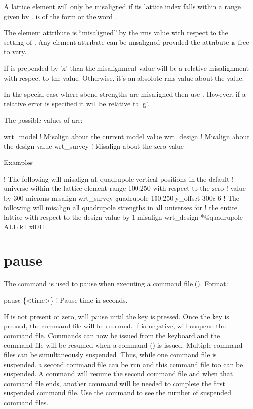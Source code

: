 A lattice element will only be misaligned if its lattice index falls within a range given
by .  is of the form  or the word .

The element attribute  is ``misaligned'' by the rms value
 with respect to the setting of . Any element attribute can
be misaligned provided the attribute is free to vary.

If  is prepended by 'x' then the misalignment value will be a
relative misalignment with respect to the  value. Otherwise, it's an absolute
rms value about the  value.

In the special case where sbend strengths are misaligned then use . However, if a relative error is specified it will be relative to 'g'.

The possible values of  are:
\begin{example}
  wrt_model          ! Misalign about the current model value
  wrt_design         ! Misalign about the design value
  wrt_survey         ! Misalign about the zero value
\end{example}

Examples
\begin{example}
   ! The following will misalign all quadrupole vertical positions in the default
   ! universe within the lattice element range 100:250 with respect to the zero 
   ! value by 300 microns
  misalign wrt_survey quadrupole 100:250 y_offset 300e-6
   ! The following will misalign all quadrupole strengths in all universes for
   ! the entire lattice with respect to the design value by 1%
  misalign wrt_design *@quadrupole ALL k1 x0.01
\end{example}

\section{pause}
\label{s:pause}

The  command is used to pause \tao when executing a command file
(). Format:
\begin{example}
  pause \{<time>\} ! Pause time in seconds.
\end{example}
\vskip 10pt

If  is not present or zero, \tao will pause until the  key is
pressed. Once the  key is pressed, the command file will be resumed. If 
is negative, \tao will suspend the command file. Commands can now be issued from the
keyboard and the command file will be resumed when a  command
() is issued. Multiple command files can be simultaneously suspended.
Thus, while one command file is suspended, a second command file can be run and this
command file too can be suspended. A  command will resume the second command
file and when that command file ends, another  command will be needed to
complete the first suspended command file. Use the  command to see the
number of suspended command files.

